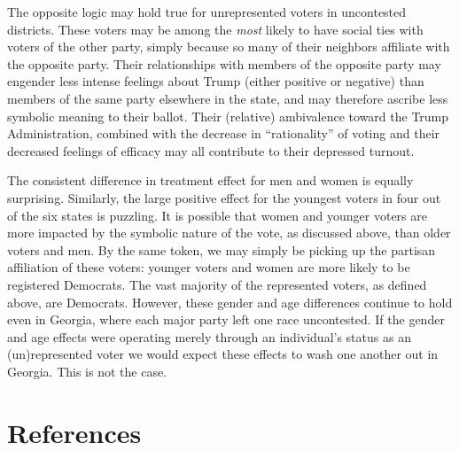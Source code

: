 \documentclass[
  12pt,
]{article}
\begin{document}
The opposite logic may hold true for unrepresented voters in uncontested districts. These voters may be among the \emph{most} likely to have social ties with voters of the other party, simply because so many of their neighbors affiliate with the opposite party. Their relationships with members of the opposite party may engender less intense feelings about Trump (either positive or negative) than members of the same party elsewhere in the state, and may therefore ascribe less symbolic meaning to their ballot. Their (relative) ambivalence toward the Trump Administration, combined with the decrease in ``rationality'' of voting and their decreased feelings of efficacy may all contribute to their depressed turnout.

The consistent difference in treatment effect for men and women is equally surprising. Similarly, the large positive effect for the youngest voters in four out of the six states is puzzling. It is possible that women and younger voters are more impacted by the symbolic nature of the vote, as discussed above, than older voters and men. By the same token, we may simply be picking up the partisan affiliation of these voters: younger voters and women are more likely to be registered Democrats. The vast majority of the represented voters, as defined above, are Democrats. However, these gender and age differences continue to hold even in Georgia, where each major party left one race uncontested. If the gender and age effects were operating merely through an individual's status as an (un)represented voter we would expect these effects to wash one another out in Georgia. This is not the case.

\newpage

\hypertarget{references}{%
\section*{References}\label{references}}
\end{document}

